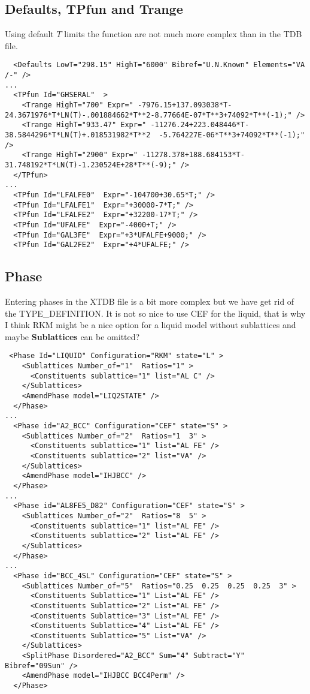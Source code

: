 \documentclass{article}
\begin{document}
\begin{appendices}
\subsection{Defaults, TPfun and Trange}

Using default $T$ limits the function are not much more complex than
in the TDB file.

{\small
\begin{verbatim}
  <Defaults LowT="298.15" HighT="6000" Bibref="U.N.Known" Elements="VA /-" />
...
  <TPfun Id="GHSERAL"  >
    <Trange HighT="700" Expr=" -7976.15+137.093038*T-24.3671976*T*LN(T)-.001884662*T**2-8.77664E-07*T**3+74092*T**(-1);" />
    <Trange HighT="933.47" Expr=" -11276.24+223.048446*T-38.5844296*T*LN(T)+.018531982*T**2  -5.764227E-06*T**3+74092*T**(-1);" />
    <Trange HighT="2900" Expr=" -11278.378+188.684153*T-31.748192*T*LN(T)-1.230524E+28*T**(-9);" />
  </TPfun>
...
  <TPfun Id="LFALFE0"  Expr="-104700+30.65*T;" />
  <TPfun Id="LFALFE1"  Expr="+30000-7*T;" />
  <TPfun Id="LFALFE2"  Expr="+32200-17*T;" />
  <TPfun Id="UFALFE"  Expr="-4000+T;" />
  <TPfun Id="GAL3FE"  Expr="+3*UFALFE+9000;" />
  <TPfun Id="GAL2FE2"  Expr="+4*UFALFE;" />
\end{verbatim}
}

\subsection{Phase}\label{sec:phase example}

Entering phases in the XTDB file is a bit more complex but we have get
rid of the TYPE\_DEFINITION.  It is not so nice to use CEF for the
liquid, that is why I think RKM might be a nice option for a liquid
model without sublattices and maybe {\bf Sublattices} can be omitted?

{\small
\begin{verbatim}
 <Phase Id="LIQUID" Configuration="RKM" state="L" >
    <Sublattices Number_of="1"  Ratios="1" >
      <Constituents sublattice="1" list="AL C" />
    </Sublattices>
    <AmendPhase model="LIQ2STATE" />
  </Phase>
...
  <Phase id="A2_BCC" Configuration="CEF" state="S" >
    <Sublattices Number_of="2"  Ratios="1  3" >
      <Constituents sublattice="1" list="AL FE" />
      <Constituents sublattice="2" list="VA" />
    </Sublattices>
    <AmendPhase model="IHJBCC" />
  </Phase>
...
  <Phase id="AL8FE5_D82" Configuration="CEF" state="S" >
    <Sublattices Number_of="2"  Ratios="8  5" >
      <Constituents sublattice="1" list="AL FE" />
      <Constituents sublattice="2" list="AL FE" />
    </Sublattices>
  </Phase>
...
  <Phase id="BCC_4SL" Configuration="CEF" state="S" >
    <Sublattices Number_of="5"  Ratios="0.25  0.25  0.25  0.25  3" >
      <Constituents Sublattice="1" List="AL FE" />
      <Constituents Sublattice="2" List="AL FE" />
      <Constituents Sublattice="3" List="AL FE" />
      <Constituents Sublattice="4" List="AL FE" />
      <Constituents Sublattice="5" List="VA" />
    </Sublattices>
    <SplitPhase Disordered="A2_BCC" Sum="4" Subtract="Y" Bibref="09Sun" />
    <AmendPhase model="IHJBCC BCC4Perm" />
  </Phase>


\end{verbatim}}
\end{appendices}
\end{document}
